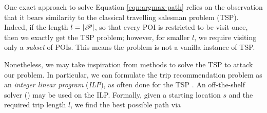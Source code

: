



One exact approach to solve Equation \ref{eqn:argmax-path}
relies on the observation that
it bears similarity to the classical travelling salesman problem (TSP).
Indeed, if the length $l = |\mathscr{P}|$, so that every POI is restricted to be visit once,
then we exactly get the TSP problem;
however, for smaller $l$, we require visiting only a \emph{subset} of POIs.
This means the problem is not a vanilla instance of TSP.

Nonetheless, we may take inspiration from methods to solve the TSP to attack our problem.
In particular, 
we can formulate the trip recommendation problem as an \emph{integer linear program} (\emph{ILP}),
as often done for the TSP \citep{opt98}.
An off-the-shelf solver () may be used on the ILP.
Formally, given a starting location $s$ and the required trip length $l$,
we find the best possible path
via \citep{Chen:2017}

